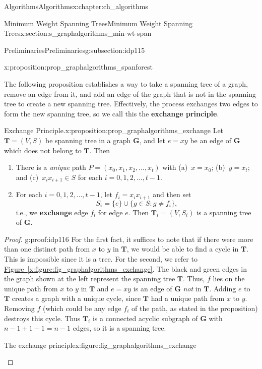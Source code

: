 \documentclass[oneside,10pt,]{book}
\newcommand{\xreffont}{\relax}
\newcommand{\terminology}[1]{\textbf{#1}}
\numberwithin{equation}{section}
\newcommand{\bfG}{\mathbf{G}}
\newcommand{\bfT}{\mathbf{T}}
\begin{document}
\begin{chapterptx}{Algorithms}{}{Algorithms}{}{}{x:chapter:ch_algorithms}
\begin{sectionptx}{Minimum Weight Spanning Trees}{}{Minimum Weight Spanning Trees}{}{}{x:section:s_graphalgorithms_min-wt-span}
\begin{subsectionptx}{Preliminaries}{}{Preliminaries}{}{}{g:subsection:idp115}
\begin{proposition}{}{}{x:proposition:prop_graphalgorithms_spanforest}
\end{proposition}
The following proposition establishes a way to take a spanning tree of a graph, remove an edge from it, and add an edge of the graph that is not in the spanning tree to create a new spanning tree. Effectively, the process exchanges two edges to form the new spanning tree, so we call this the \terminology{exchange principle}.%
\begin{proposition}{Exchange Principle.}{}{x:proposition:prop_graphalgorithms_exchange}%
Let \(\bfT=(V,S)\) be spanning tree in a graph \(\bfG\), and let \(e=xy\) be an edge of \(\bfG\) which does not belong to \(\bfT\). Then%
\begin{enumerate}
\item{}There is a \emph{unique} path \(P=(x_0,x_1,x_2,\dots,x_t)\) with (a)~\(x=x_0\); (b)~\(y=x_t\); and (c)~\(x_ix_{i+1}\in S\) for each \(i=0,1,2,\dots,t-1\).%
\item{}For each \(i=0,1,2,\dots,t-1\), let \(f_i=x_ix_{i+1}\) and then set%
\begin{equation*}
S_i = \{e\}\cup\{g\in S: g\neq f_i\},
\end{equation*}
i.e.\@, we \terminology{exchange} edge \(f_i\) for edge \(e\). Then \(\bfT_i=(V,S_i)\) is a spanning tree of \(\bfG\).%
\end{enumerate}
%
\end{proposition}
\begin{proof}{}{g:proof:idp116}
For the first fact, it suffices to note that if there were more than one distinct path from \(x\) to \(y\) in \(\bfT\), we would be able to find a cycle in \(\bfT\). This is impossible since it is a tree. For the second, we refer to \hyperref[x:figure:fig_graphalgorithms_exchange]{Figure~{\xreffont\ref{x:figure:fig_graphalgorithms_exchange}}}. The black and green edges in the graph shown at the left represent the spanning tree \(\bfT\). Thus, \(f\) lies on the unique path from \(x\) to \(y\) in \(\bfT\) and \(e=xy\) is an edge of \(\bfG\) \emph{not} in \(\bfT\). Adding \(e\) to \(\bfT\) creates a graph with a unique cycle, since \(\bfT\) had a unique path from \(x\) to \(y\). Removing \(f\) (which could be any edge \(f_i\) of the path, as stated in the proposition) destroys this cycle. Thus \(\bfT_i\) is a connected acyclic subgraph of \(\bfG\) with \(n-1+1-1=n-1\) edges, so it is a spanning tree.%
\begin{figureptx}{The exchange principle}{x:figure:fig_graphalgorithms_exchange}{}%
\begin{sidebyside}{2}{0.01}{0.01}{0.02}%

\end{sidebyside}
\end{figureptx}
\end{proof}
\end{subsectionptx}
\end{sectionptx}
\end{chapterptx}
\end{document}
